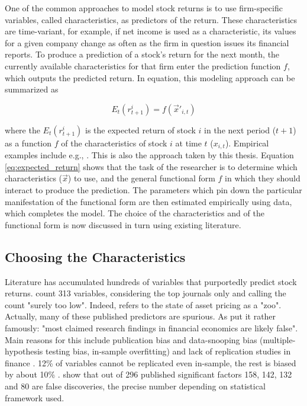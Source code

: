 		One of the common approaches to model stock returns is to use firm-specific variables, called characteristics, as predictors of the return. These characteristics are time-variant, for example, if net income is used as a characteristic, its values for a given company change as often as the firm in question issues its financial reports. To produce a prediction of a stock's return for the next month, the currently available characteristics for that firm enter the prediction function $f$, which outputs the predicted return. In equation, this modeling approach can be summarized as 
		
		\begin{equation}
			E_t(r^i_{t+1}) = f(\vec{x}'_{i,t})
			\label{eq:expected_return}
		\end{equation}
	
		where the $E_t(r^i_{t+1})$ is the expected return of stock $i$ in the next period ($t+1$) as a function $f$ of the characteristics of stock $i$ at time $t$ ($x_{i,t}$). Empirical examples include e.g.,  \cite{gu2020empirical, tobek2020does, bryzgalova2019forest}. This is also the approach taken by this thesis. Equation \ref{eq:expected_return} shows that the task of the researcher is to determine which characteristics ($\vec{x}$) to use, and the general functional form $f$ in which they should interact to produce the prediction. The parameters which pin down the particular manifestation of the functional form are then estimated empirically using data, which completes the model. The choice of the characteristics and of the functional form is now discussed in turn using existing literature. 
		
		\subsection{Choosing the Characteristics}	
			
			Literature has accumulated hundreds of variables that purportedly predict stock returns. \cite{harvey2016and} count 313 variables, considering the top journals only and calling the count "surely too low". Indeed, \cite{cochrane2011presidential} refers to the state of asset pricing as a "zoo". Actually, many of these published predictors are spurious. As \cite[p.~5]{harvey2016and} put it rather famously: "most claimed research findings in financial economics are likely false". Main reasons for this include publication bias and data-snooping bias (multiple-hypothesis testing bias, in-sample overfitting) and lack of replication studies in finance \citep{harvey2016and, mclean2016does}. 12\% of variables cannot be replicated even in-sample, the rest is biased by about 10\% \citep{mclean2016does}. \cite{harvey2016and} show that out of 296 published significant factors 158, 142, 132 and 80 are false discoveries, the precise number depending on statistical framework used.
			
